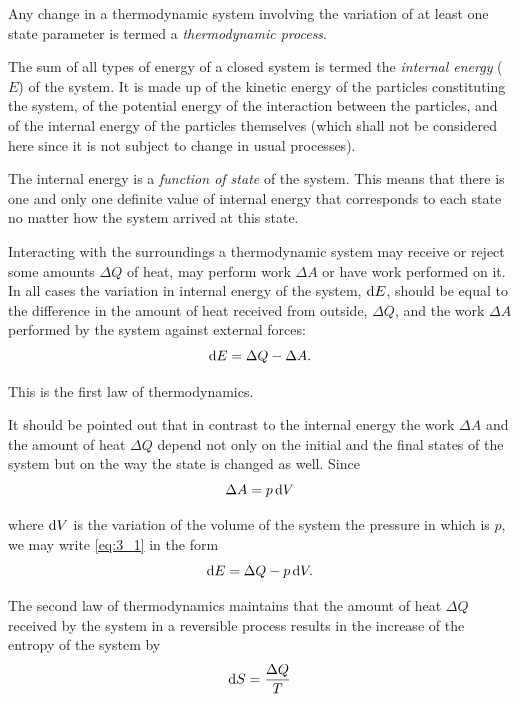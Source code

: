 Any change in a thermodynamic system involving the variation of at least one state parameter is termed a \textit{thermodynamic process}.

The sum of all types of energy of a closed system is termed the \textit{internal energy} ($E$) of the system. It is made up of the kinetic energy of the particles constituting the system, of the potential energy of the interaction between the particles, and of the internal energy of the particles themselves (which shall not be considered here since it is not subject to change in usual processes).

The internal energy is a \textit{function of state} of the system. This means that there is one and only one definite value of internal energy that corresponds to each state no matter how the system arrived at this
state.

Interacting with the surroundings a thermodynamic system may receive or reject some amounts $\Delta{Q}$ of heat, may perform work $\Delta{A}$ or have work performed on it. In all cases the variation in internal energy of the system, $\mathrm{d} E$, should be equal to the difference in the amount of heat received from outside, $\Delta{Q}$, and the work $\Delta{A}$ performed by the system against external forces:
\begin{equation}\label{eq:3_1}
    \mathrm{d} E = \Delta{Q} - \Delta{A}.
\end{equation}

\noindent
This is the first law of thermodynamics.

It should be pointed out that in contrast to the internal energy the work $\Delta{A}$ and the amount of heat $\Delta{Q}$ depend not only on the initial and the final states of the system but on the way the state is changed as well. Since
\begin{equation}\label{eq:3_2}
    \Delta{A} = p\, \mathrm{d} V
\end{equation}

\noindent
where $\mathrm{d} V$ is the variation of the volume of the system the pressure in which is $p$, we may write \eqref{eq:3_1} in the form
\begin{equation}\label{eq:3_3}
    \mathrm{d} E = \Delta{Q} - p\, \mathrm{d} V.
\end{equation}

The second law of thermodynamics maintains that the amount of heat $\Delta{Q}$ received by the system in a reversible process results in the increase of the entropy of the system by
\begin{equation}\label{eq:3_4}
    \mathrm{d} S = \frac{\Delta{Q}}{T}
\end{equation}

